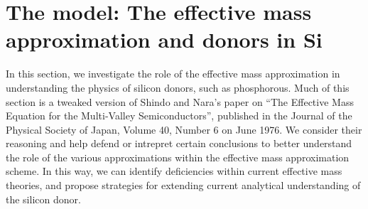 \documentclass[aps, prl, preprint]{revtex4-1}
\begin{document}
\section{The model: The effective mass approximation and donors in Si}
In this section, we investigate the role of the effective mass
approximation in understanding the physics of silicon donors, such as
phosphorous. Much of this section is a tweaked version of Shindo and
Nara's paper on ``The Effective Mass Equation for the Multi-Valley
Semiconductors'', published in the Journal of the Physical Society of
Japan, Volume 40, Number 6 on June 1976. We consider their reasoning
and help defend or intrepret certain conclusions to better understand
the role of the various approximations within the effective mass
approximation scheme. In this way, we can identify deficiencies within
current effective mass theories, and propose strategies for extending
current analytical understanding of the silicon donor.






\end{document}
